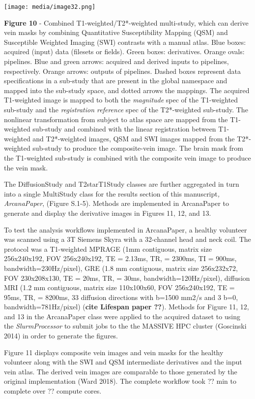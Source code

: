 \texttt{[image: media/image32.png]}

\textbf{Figure 10} - Combined T1-weighted/T2*-weighted multi-study,
which can derive vein masks by combining Quantitative Susceptibility
Mapping (QSM) and Susceptible Weighted Imaging (SWI) contrasts with a
manual atlas. Blue boxes: acquired (input) data (filesets or fields).
Green boxes: derivatives. Orange ovals: pipelines. Blue and green
arrows: acquired and derived inputs to pipelines, respectively. Orange
arrows: outputs of pipelines. Dashed boxes represent data specifications
in a sub-study that are present in the global namespace and mapped into
the sub-study space, and dotted arrows the mappings. The acquired
T1-weighted image is mapped to both the \emph{magnitude} spec of the
T1-weighted sub-study and the \emph{registration reference} spec of the
T2*-weighted sub-study. The nonlinear transformation from subject to
atlas space are mapped from the T1-weighted sub-study and combined with
the linear registration between T1-weighted and T2*-weighted images, QSM
and SWI images mapped from the T2*-weighted sub-study to produce the
composite-vein image. The brain mask from the T1-weighted sub-study is
combined with the composite vein image to produce the vein mask.

The DiffusionStudy and T2starT1Study classes are further aggregated in
turn into a single MultiStudy class for the results section of this
manuscript\emph{, ArcanaPaper}, (Figure S.1-5). Methods are implemented
in ArcanaPaper to generate and display the derivative images in Figures
11, 12, and 13.

To test the analysis workflows implemented in ArcanaPaper, a healthy
volunteer was scanned using a 3T Siemens Skyra with a 32-channel head
and neck coil. The protocol was a T1-weighted MPRAGE (1mm contiguous,
matrix size 256x240x192, FOV 256x240x192, TE = 2.13ms, TR, = 2300ms, TI
= 900ms, bandwidth=230Hz/pixel), GRE (1.8 mm contiguous, matrix size
256x232x72, FOV 230x208x130, TE = 20ms, TR, = 30ms,
bandwidth=120Hz/pixel), diffusion MRI (1.2 mm contiguous, matrix size
110x100x60, FOV 256x240x192, TE = 95ms, TR, = 8200ms, 33 diffusion
directions with b=1500 mm2/s and 3 b=0, bandwidth=781Hz/pixel)
(\textbf{cite Lifespan paper ??}). Methods for Figure 11, 12, and 13 in
the ArcanaPaper class were applied to the acquired dataset to using the
\emph{SlurmProcessor} to submit jobs to the the MASSIVE HPC cluster
(Goscinski 2014) in order to generate the figures.

Figure 11 displays composite vein images and vein masks for the healthy
volunteer along with the SWI and QSM intermediate derivatives and the
input vein atlas. The derived vein images are comparable to those
generated by the original implementation (Ward 2018). The complete
workflow took ?? min to complete over ?? compute cores.


